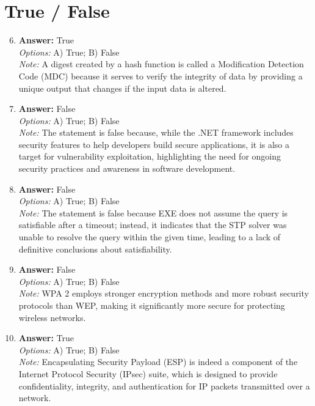 \documentclass[12pt]{article}
\begin{document}
\section*{True / False}
\begin{enumerate}[label=\arabic*.]
\setcounter{enumi}{5}
\item \textbf{Answer:} True
\\ \textit{Options:} A) True; B) False
\\ \textit{Note:} A digest created by a hash function is called a Modification Detection Code (MDC) because it serves to verify the integrity of data by providing a unique output that changes if the input data is altered.
\item \textbf{Answer:} False
\\ \textit{Options:} A) True; B) False
\\ \textit{Note:} The statement is false because, while the .NET framework includes security features to help developers build secure applications, it is also a target for vulnerability exploitation, highlighting the need for ongoing security practices and awareness in software development.
\item \textbf{Answer:} False
\\ \textit{Options:} A) True; B) False
\\ \textit{Note:} The statement is false because EXE does not assume the query is satisfiable after a timeout; instead, it indicates that the STP solver was unable to resolve the query within the given time, leading to a lack of definitive conclusions about satisfiability.
\item \textbf{Answer:} False
\\ \textit{Options:} A) True; B) False
\\ \textit{Note:} WPA 2 employs stronger encryption methods and more robust security protocols than WEP, making it significantly more secure for protecting wireless networks.
\item \textbf{Answer:} True
\\ \textit{Options:} A) True; B) False
\\ \textit{Note:} Encapsulating Security Payload (ESP) is indeed a component of the Internet Protocol Security (IPsec) suite, which is designed to provide confidentiality, integrity, and authentication for IP packets transmitted over a network.
\end{enumerate}
\end{document}

